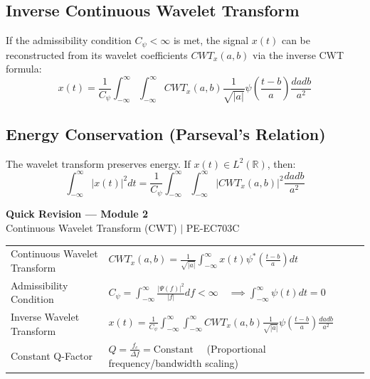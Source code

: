 \documentclass[12pt,a4paper]{article}
\renewcommand{\arraystretch}{1.45}
\begin{document}
\subsection{Inverse Continuous Wavelet Transform}
If the admissibility condition $C_{\psi} < \infty$ is met, the signal $x(t)$ can be reconstructed from its wavelet coefficients $CWT_x(a, b)$ via the inverse CWT formula:
$$x(t) = \frac{1}{C_{\psi}} \int_{-\infty}^{\infty} \int_{-\infty}^{\infty} CWT_x(a, b) \frac{1}{\sqrt{|a|}} \psi\left(\frac{t-b}{a}\right) \frac{da db}{a^2}$$

\subsection{Energy Conservation (Parseval's Relation)}
The wavelet transform preserves energy. If $x(t) \in L^2(\mathbb{R})$, then:
$$\int_{-\infty}^{\infty} |x(t)|^2 dt = \frac{1}{C_{\psi}} \int_{-\infty}^{\infty} \int_{-\infty}^{\infty} |CWT_x(a, b)|^2 \frac{da db}{a^2}$$

\newpage
\begin{center}
  {\large\bfseries\color{myred} Quick Revision --- Module 2}\\[3pt]
  {\small\color{mydark} Continuous Wavelet Transform (CWT) $|$ PE-EC703C}
\end{center}
\noindent{\color{myred}\rule{\linewidth}{1.2pt}}
\vspace{4pt}

\begin{tcolorbox}[formulabox, title={\textbf{Key Wavelet Equations}}]
\renewcommand{\arraystretch}{1.35}
\begin{tabularx}{\linewidth}{B{5.0cm} X}
Continuous Wavelet Transform & $CWT_x(a, b) = \frac{1}{\sqrt{|a|}} \int_{-\infty}^{\infty} x(t) \psi^*\left(\frac{t-b}{a}\right) dt$ \\[4pt]
Admissibility Condition & $C_{\psi} = \int_{-\infty}^{\infty} \frac{|\Psi(f)|^2}{|f|} df < \infty \quad \implies \int_{-\infty}^{\infty} \psi(t) dt = 0$ \\[4pt]
Inverse Wavelet Transform & $x(t) = \frac{1}{C_{\psi}} \int_{-\infty}^{\infty} \int_{-\infty}^{\infty} CWT_x(a, b) \frac{1}{\sqrt{|a|}} \psi\left(\frac{t-b}{a}\right) \frac{da db}{a^2}$ \\[4pt]
Constant Q-Factor & $Q = \frac{f_c}{\Delta f} = \text{Constant} \quad$ (Proportional frequency/bandwidth scaling)
\end{tabularx}
\end{tcolorbox}
\end{document}
